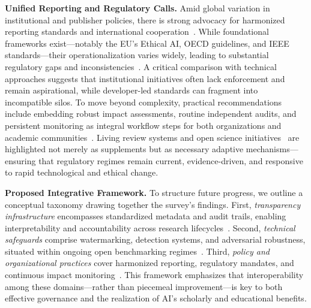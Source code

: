 \documentclass[sigconf]{acmart}
\begin{document}
\textbf{Unified Reporting and Regulatory Calls.}  
Amid global variation in institutional and publisher policies, there is strong advocacy for harmonized reporting standards and international cooperation~\cite{ref5,ref9,ref10,ref28,ref29,ref30,ref31,ref38,ref43,ref63,ref68,ref87,ref88,ref89,ref90,ref106}. While foundational frameworks exist---notably the EU's Ethical AI, OECD guidelines, and IEEE standards---their operationalization varies widely, leading to substantial regulatory gaps and inconsistencies~\cite{ref9,ref10,ref28,ref29,ref38,ref51,ref62,ref86,ref87,ref88,ref90,ref96,ref106}. A critical comparison with technical approaches suggests that institutional initiatives often lack enforcement and remain aspirational, while developer-led standards can fragment into incompatible silos. To move beyond complexity, practical recommendations include embedding robust impact assessments, routine independent audits, and persistent monitoring as integral workflow steps for both organizations and academic communities~\cite{ref29,ref31,ref43,ref61,ref62,ref63,ref80,ref84,ref85,ref89,ref92,ref95,ref96,ref98,ref100,ref106}. Living review systems and open science initiatives~\cite{ref43,ref61,ref70,ref84,ref86,ref95,ref100,ref101,ref106,ref110} are highlighted not merely as supplements but as necessary adaptive mechanisms---ensuring that regulatory regimes remain current, evidence-driven, and responsive to rapid technological and ethical change.

\textbf{Proposed Integrative Framework.}  
To structure future progress, we outline a conceptual taxonomy drawing together the survey's findings. First, \emph{transparency infrastructure} encompasses standardized metadata and audit trails, enabling interpretability and accountability across research lifecycles~\cite{ref95,ref100,ref101,ref106}. Second, \emph{technical safeguards} comprise watermarking, detection systems, and adversarial robustness, situated within ongoing open benchmarking regimes~\cite{ref53,ref86,ref91,ref97,ref98,ref100}. Third, \emph{policy and organizational practices} cover harmonized reporting, regulatory mandates, and continuous impact monitoring~\cite{ref29,ref31,ref43,ref61,ref63,ref80,ref84,ref95,ref96,ref100,ref106}. This framework emphasizes that interoperability among these domains---rather than piecemeal improvement---is key to both effective governance and the realization of AI's scholarly and educational benefits.
\end{document}
